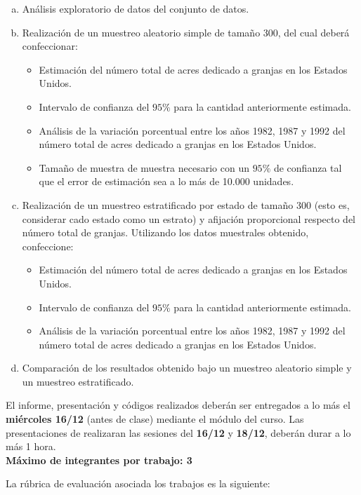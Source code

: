 \begin{enumerate}[a)]
\item Análisis exploratorio de datos del conjunto de datos.
\item Realización de un muestreo aleatorio simple de tamaño 300, del cual deberá confeccionar:
\begin{itemize}
\item Estimación del número total de acres dedicado a granjas en los Estados Unidos.
\item Intervalo de confianza del $95\%$ para la cantidad anteriormente estimada.
\item Análisis de la variación porcentual entre los años 1982, 1987 y 1992 del número total de acres dedicado a granjas en los Estados Unidos.
\item Tamaño de muestra de muestra necesario con un $95\%$ de confianza tal que el error de estimación sea a lo más de 10.000 unidades.
\end{itemize}
\item Realización de un muestreo estratificado por estado de tamaño 300 (esto es, considerar cado estado como un estrato) y afijación proporcional respecto del número total de granjas. Utilizando los datos muestrales obtenido, confeccione:
\begin{itemize}
\item Estimación del número total de acres dedicado a granjas en los Estados Unidos.
\item Intervalo de confianza del $95\%$ para la cantidad anteriormente estimada.
\item Análisis de la variación porcentual entre los años 1982, 1987 y 1992 del número total de acres dedicado a granjas en los Estados Unidos.
\end{itemize}
\item Comparación de los resultados obtenido bajo un muestreo aleatorio simple y un muestreo estratificado.
\end{enumerate}

El informe, presentación y códigos realizados deberán ser entregados a lo más el \textbf{miércoles 16/12} (antes de clase) mediante el módulo del curso. Las presentaciones de realizaran las sesiones del \textbf{16/12} y \textbf{18/12}, deberán durar a lo más 1 hora.\\

\textbf{Máximo de integrantes por trabajo: 3}

La rúbrica de evaluación asociada los trabajos es la siguiente:

